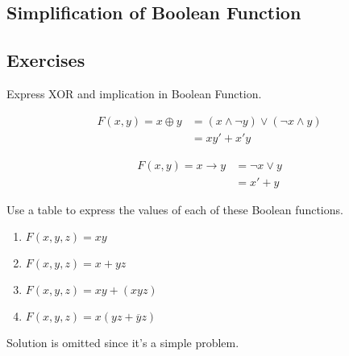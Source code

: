    \subsection{Simplification of Boolean Function}
        

    \subsection{Exercises}
    \begin{exercise}
        Express XOR and implication in Boolean Function.
    \end{exercise}
    \begin{solution}
        \begin{align*}
            F(x,y)= x \oplus y &= (x \land \lnot y) \lor (\lnot x \land y)\\
                       &= xy' + x'y
            \end{align*}

            \begin{align*}
                F(x,y)= x \rightarrow y &= \lnot x \lor y\\
                                &= x' + y
                \end{align*}
    \end{solution}

    \begin{exercise}
        Use a table to express the values of each of these Boolean functions.
        \begin{enumerate}[label=\alph*)]
            \item $F(x, y, z) = xy$
            \item $F(x, y, z) = x + yz$
            \item $F(x, y, z) = xy + (xyz)$
            \item $F(x, y, z) = x(yz + \overline{y}z)$
        \end{enumerate}
            Solution is omitted since it's a simple problem.
    \end{exercise}

